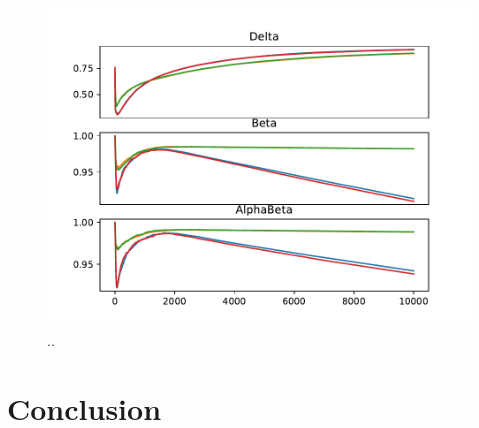 \documentclass[conference]{IEEEtran}
\begin{document}
\begin{figure}[t]
 \begin{minipage}{\columnwidth}
 \centering
  \includegraphics[width=\textwidth]{./imgs/gridHasselt/lrs.pdf}
 \end{minipage}
  \caption{..}
  \label{F:hasselt_all}
\end{figure}

\section{Conclusion}









\end{document}
